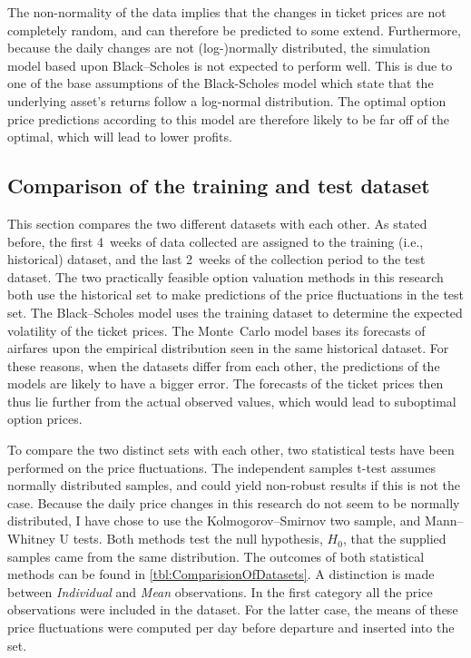 The non-normality of the data implies that the changes in ticket prices are not completely random, and can therefore be predicted to some extend. Furthermore, because the daily changes are not (log-)normally distributed, the simulation model based upon Black--Scholes is not expected to perform well. This is due to one of the base assumptions of the Black-Scholes model which state that the underlying asset's returns follow a log-normal distribution. The optimal option price predictions according to this model are therefore likely to be far off of the optimal, which will lead to lower profits.

\subsection{Comparison of the training and test dataset}
This section compares the two different datasets with each other. As stated before, the first 4~weeks of data collected are assigned to the training (i.e., historical) dataset, and the last 2~weeks of the collection period to the test dataset. The two practically feasible option valuation methods in this research both use the historical set to make predictions of the price fluctuations in the test set. The Black--Scholes model uses the training dataset to determine the expected volatility of the ticket prices. The Monte~Carlo model bases its forecasts of airfares upon the empirical distribution seen in the same historical dataset. For these reasons, when the datasets differ from each other, the predictions of the models are likely to have a bigger error. The forecasts of the ticket prices then thus lie further from the actual observed values, which would lead to suboptimal option prices.

To compare the two distinct sets with each other, two statistical tests have been performed on the price fluctuations. The independent samples t-test assumes normally distributed samples, and could yield non-robust results if this is not the case. Because the daily price changes in this research do not seem to be normally distributed, I have chose to use the Kolmogorov--Smirnov two sample, and Mann--Whitney U tests. Both methods test the null hypothesis, $H_0$, that the supplied samples came from the same distribution.  The outcomes of both statistical methods can be found in \autoref{tbl:ComparisionOfDatasets}. A distinction is made between \emph{Individual} and \emph{Mean} observations. In the first category all the price observations were included in the dataset. For the latter case, the means of these price fluctuations were computed per day before departure and inserted into the set.


